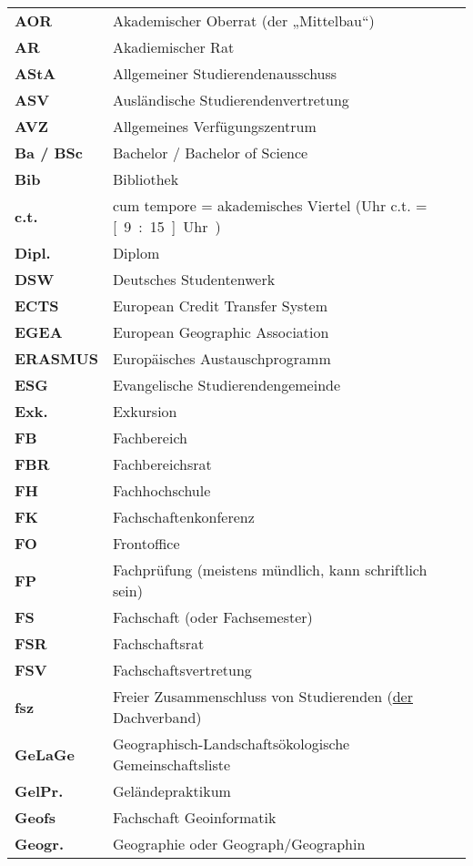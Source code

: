 \begin{longtable}{p{} p{}}
  \textbf{AOR} & Akademischer Oberrat (der „Mittelbau“)\\
  \textbf{AR} & Akadiemischer Rat\\
  \textbf{AStA} & Allgemeiner Studierendenausschuss\\
  \textbf{ASV} & Ausländische Studierendenvertretung\\
  \textbf{AVZ} & Allgemeines Verfügungszentrum\\
  \textbf{Ba / BSc} & Bachelor / Bachelor of Science\\
  \textbf{Bib} & Bibliothek\\
  \textbf{c.t.} & cum tempore = akademisches Viertel (\unit[9]{Uhr} c.t. = \unit[9:15]{Uhr})\\
  \textbf{Dipl.} & Diplom\\
  \textbf{DSW} & Deutsches Studentenwerk\\
  \textbf{ECTS} & European Credit Transfer System\\
  \textbf{EGEA} & European Geographic Association\\
  \textbf{ERASMUS} & Europäisches Austauschprogramm\\
  \textbf{ESG} & Evangelische Studierendengemeinde\\
  \textbf{Exk.} & Exkursion\\
  \textbf{FB} & Fachbereich\\
  \textbf{FBR} & Fachbereichsrat\\
  \textbf{FH} & Fachhochschule\\
  \textbf{FK} & Fachschaftenkonferenz\\
  \textbf{FO} & Frontoffice\\
  \textbf{FP} & Fachprüfung (meistens mündlich, kann schriftlich sein)\\
  \textbf{FS} & Fachschaft \tiny{(oder Fachsemester)}\\ 
  \textbf{FSR} & Fachschaftsrat\\
  \textbf{FSV} & Fachschaftsvertretung\\
  \textbf{fsz} & Freier Zusammenschluss von Studierenden (\underline{der} Dachverband)\\       
  \textbf{GeLaGe} & Geographisch-Landschaftsökologische Gemeinschaftsliste\\ 
  \textbf{GelPr.} & Geländepraktikum\\
  \textbf{Geofs} & Fachschaft Geoinformatik\\
  \textbf{Geogr.} & Geographie oder Geograph/Geographin\\

\end{longtable}

